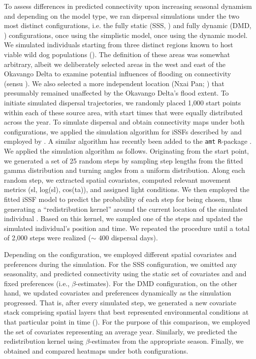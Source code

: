 \documentclass[abstract=on,10pt,a4paper,bibliography=totocnumbered]{article}
\begin{document}
To assess differences in predicted connectivity upon increasing seasonal
dynamism and depending on the model type, we ran dispersal simulations under the
two most distinct configurations, i.e. the fully static (SSS,
) and fully dynamic (DMD,
) configurations, once using the simplistic model,
once using the dynamic model. We simulated individuals starting from three
distinct regions known to host viable wild dog populations
(). The definition of these areas was somewhat arbitrary,
albeit we deliberately selected areas in the west and east of the Okavango Delta
to examine potential influences of flooding on connectivity (sensu
\citealp{Hofmann.2024}). We also selected a more independent location (Nxai Pan;
) that presumably remained unaffected by the Okavango Delta's
flood extent. To initiate simulated dispersal trajectories, we randomly placed
1,000 start points within each of these source area, with start times that were
equally distributed across the year. To simulate dispersal and obtain
connectivity maps under both configurations, we applied the simulation algorithm
for iSSFs described by \citet{Signer.2017} and employed by \citet{Hofmann.2023}.
A similar algorithm has recently been added to the \texttt{amt}
\texttt{R}-package \citep{Signer.2024}. We applied the simulation algorithm as
follows. Originating from the start point, we generated a set of 25 random steps
by sampling step lengths from the fitted gamma distribution and turning angles
from a uniform distribution. Along each random step, we extracted spatial
covariates, computed relevant movement metrics (sl, log(sl), cos(ta)), and
assigned light conditions. We then employed the fitted iSSF model to predict the
probability of each step for being chosen, thus generating a ``redistribution
kernel'' around the current location of the simulated individual
\citep{Signer.2017, Signer.2024}. Based on this kernel, we sampled one of the
steps and updated the simulated individual's position and time. We repeated the
procedure until a total of 2,000 steps were realized ($\sim$ 400 dispersal
days).

Depending on the configuration, we employed different spatial covariates and
preferences during the simulation. For the SSS configuration, we omitted any
seasonality, and predicted connectivity using the static set of covariates and
and fixed preferences (i.e., $\beta$-estimates). For the DMD configuration, on
the other hand, we updated covariates and preferences dynamically as the
simulation progressed. That is, after every simulated step, we generated a new
covariate stack comprising spatial layers that best represented environmental
conditions at that particular point in time (). For the purpose
of this comparison, we employed the set of covariates representing an average
year. Similarly, we predicted the redistribution kernel using $\beta$-estimates
from the appropriate season. Finally, we obtained and compared heatmaps under
both configurations.
\end{document}
